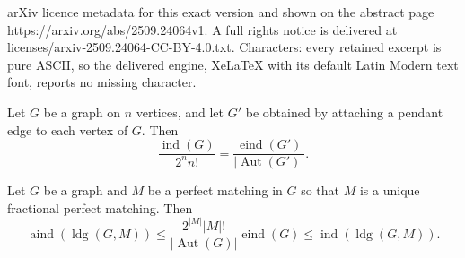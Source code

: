 \documentclass[10pt,a4paper]{amsart}
\DeclareMathOperator{\Aut}{Aut}
\DeclareMathOperator{\aind}{aind}
\DeclareMathOperator{\eind}{eind}
\DeclareMathOperator{\ind}{ind}
\DeclareMathOperator{\ldg}{ldg}
\newcommand{\abs}[1]{\left\lvert#1\right\rvert}
\begin{document}
arXiv licence metadata for this exact version and shown on the abstract page https://arxiv.org/abs/2509.24064v1. A full rights notice is delivered at licenses/arxiv-2509.24064-CC-BY-4.0.txt. Characters: every retained excerpt is pure ASCII, so the delivered engine, XeLaTeX with its default Latin Modern text font, reports no missing character.
\begin{theorem}\label{thm:eind-as-hard-as-ind}
    Let $G$ be a graph on $n$ vertices, and let $G'$ be obtained by attaching a pendant edge to each vertex of $G$. Then
\[ \frac{\ind(G)}{2^n n!}=\frac{ \eind(G')}{|\Aut(G')|} . \]
\end{theorem}

\begin{theorem}\label{thm:aind-eind-ind}
    Let $G$ be a graph and $M$ be a perfect matching in $G$ so that $M$ is a unique fractional perfect matching.
    Then 
    \[\aind(\ldg(G,M))\leq \frac{2^{\abs{M}}\abs{M}!}{\abs{\Aut(G)}}\eind(G)\leq \ind(\ldg(G,M)).\]
\end{theorem}
\end{document}
